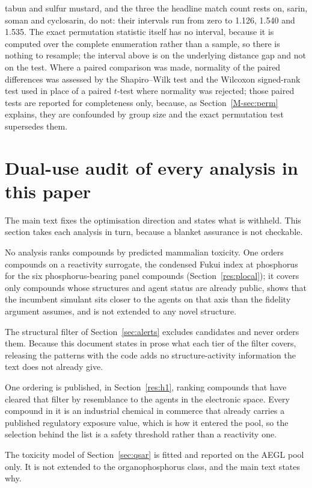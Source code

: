 \documentclass[11pt,a4paper]{article}
\begin{document}
tabun and sulfur mustard, and the three the headline match count rests on,
sarin, soman and cyclosarin, do not: their intervals run from zero to 1.126,
1.540 and 1.535. The exact permutation statistic itself has no interval,
because it is computed over the complete enumeration rather than a sample, so
there is nothing to resample; the interval above is on the underlying distance
gap and not on the test. Where a paired comparison was made,
normality of the paired differences was assessed by the Shapiro--Wilk test
\cite{shapiro1965} and the Wilcoxon signed-rank test \cite{wilcoxon1945} used
in place of a paired $t$-test where normality was rejected; those paired tests
are reported for completeness only, because, as Section~\ref{M-sec:perm} explains,
they are confounded by group size and the exact permutation test supersedes them.
\section{Dual-use audit of every analysis in this paper}
\label{sec:dualuse}

The main text fixes the optimisation direction and states what is withheld. This
section takes each analysis in turn, because a blanket assurance is not
checkable.

No analysis ranks compounds by predicted mammalian toxicity. One orders
compounds on a reactivity surrogate, the condensed Fukui index at phosphorus for
the six phosphorus-bearing panel compounds (Section~\ref{res:plocal}); it covers
only compounds whose structures and agent status are already public, shows that
the incumbent simulant sits closer to the agents on that axis than the fidelity
argument assumes, and is not extended to any novel structure.

The structural filter of Section~\ref{sec:alerts} excludes candidates and never
orders them. Because this document states in prose what each tier of the filter
covers, releasing the patterns with the code adds no structure-activity
information the text does not already give.

One ordering is published, in Section~\ref{res:h1}, ranking compounds that have
cleared that filter by resemblance to the agents in the electronic space. Every
compound in it is an industrial chemical in commerce that already carries a
published regulatory exposure value, which is how it entered the pool, so the
selection behind the list is a safety threshold rather than a reactivity one.

The toxicity model of Section~\ref{sec:qsar} is fitted and reported on the AEGL
pool only. It is not extended to the organophosphorus class, and the main text
states why.
\end{document}
